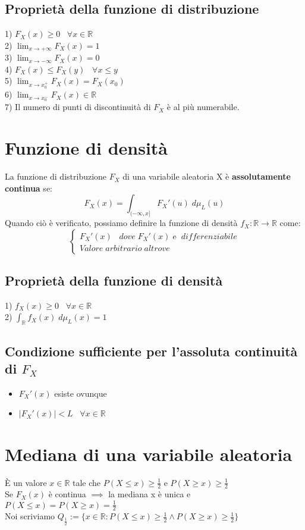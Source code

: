 \documentclass{article}
\begin{document}
\subsection*{Proprietà della funzione di distribuzione}
1) $F_{X}(x) \geq 0 \; \; \; \forall x \in \mathbb{R}$\\
2) $\lim_{x\to +\infty}F_{X}(x) = 1$\\
3) $\lim_{x\to -\infty}F_{X}(x) = 0$\\
4) $F_{X}(x) \leq F_{X}(y) \; \; \; \forall x \leq y$\\
5) $\lim_{x\to x_{0}^{+}}F_{X}(x) = F_{X}(x_{0})$\\
6) $\lim_{x\to x_{0}^{-}}F_{X}(x) \in \mathbb{R}$\\
7) Il numero di punti di discontinuità di $F_{X}$ è al più numerabile.

\section*{Funzione di densità}
La funzione di distribuzione $F_{X}$ di una variabile aleatoria X è \textbf{assolutamente continua} se:
\[ F_{X}(x) = \int_{(-\infty,x]}^{}F_{X}'(u) \; d\mu_{L}(u) \]
Quando ciò è verificato, possiamo definire la funzione di densità $f_{X}: \mathbb{R} \to \mathbb{R}$ come:
\[
\begin{cases}
F_{X}'(x) \; \; \; dove \; F_{X}'(x) \; e\grave \; \; differenziabile\\
Valore \; arbitrario \; altrove
\end{cases}
\]

\subsection*{Proprietà della funzione di densità}
1) $f_{X}(x) \geq 0 \; \; \; \forall x \in \mathbb{R}$\\
2) $\int_{\mathbb{R}}^{}f_{X}(x) \; d\mu_{L}(x) = 1$

\subsection*{Condizione sufficiente per l'assoluta continuità di $F_{X}$}
\begin{itemize}
\item $F_{X}'(x)$ esiste ovunque
\item $|F_{X}'(x)| < L \; \; \; \forall x \in \mathbb{R}$
\end{itemize}

\section*{Mediana di una variabile aleatoria}
\`E un valore $x \in \mathbb{R}$ tale che $P(X \leq x) \geq \frac{1}{2}$ e $P(X \geq x) \geq \frac{1}{2}$\\
Se $F_{X}(x)$ è continua $\implies$ la mediana x è unica e $P(X \leq x) =  P(X \geq x) = \frac{1}{2}$\\
Noi scriviamo $Q_{\frac{1}{2}} := \{x \in \mathbb{R} : P(X \leq x) \geq \frac{1}{2} \wedge P(X \geq x) \geq \frac{1}{2}\}$
\end{document}
